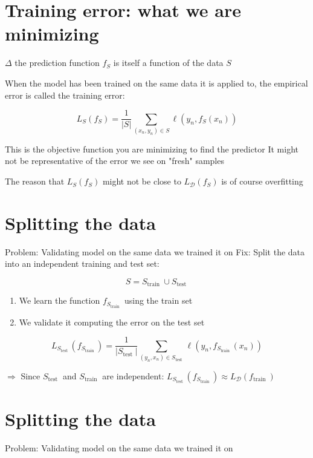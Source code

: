 \documentclass[10pt]{article}
\begin{document}
\section*{Training error: what we are minimizing}
$\Delta$ the prediction function $f_{S}$ is itself a function of the data $S$

When the model has been trained on the same data it is applied to, the empirical error is called the training error:

$$
L_{S}\left(f_{S}\right)=\frac{1}{|S|} \sum_{\left(x_{n}, y_{n}\right) \in S} \ell\left(y_{n}, f_{S}\left(x_{n}\right)\right)
$$

This is the objective function you are minimizing to find the predictor It might not be representative of the error we see on "fresh" samples

The reason that $L_{S}\left(f_{S}\right)$ might not be close to $L_{\mathscr{D}}\left(f_{S}\right)$ is of course overfitting

\section*{Splitting the data}
Problem: Validating model on the same data we trained it on Fix: Split the data into an independent training and test set:

$$
S=S_{\text {train }} \cup S_{\text {test }}
$$

\begin{enumerate}
  \item We learn the function $f_{S_{\text {train }}}$ using the train set

  \item We validate it computing the error on the test set

\end{enumerate}

$$
L_{S_{\text {test }}}\left(f_{S_{\text {train }}}\right)=\frac{1}{\left|S_{\text {test }}\right|} \sum_{\left(y_{n}, x_{n}\right) \in S_{\text {test }}} \ell\left(y_{n}, f_{S_{\text {train }}}\left(x_{n}\right)\right)
$$

$\Rightarrow$ Since $S_{\text {test }}$ and $S_{\text {train }}$ are independent: $L_{S_{\text {test }}}\left(f_{S_{\text {train }}}\right) \approx L_{\mathscr{D}}\left(f_{\text {train }}\right)$

\section*{Splitting the data}
Problem: Validating model on the same data we trained it on
\end{document}
